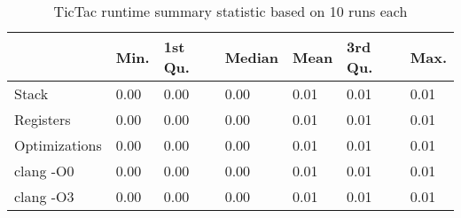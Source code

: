 \begin{table}[h!]
\centering
\begin{tabular}{p{}p{}p{}p{}p{}p{}p{}}
  \hline
 & Min. & 1st Qu. & Median & Mean & 3rd Qu. & Max. \\ 
  \hline
Stack & 0.00 & 0.00 & 0.00 & 0.01 & 0.01 & 0.01 \\ 
  Registers & 0.00 & 0.00 & 0.00 & 0.01 & 0.01 & 0.01 \\ 
  Optimizations & 0.00 & 0.00 & 0.00 & 0.01 & 0.01 & 0.01 \\ 
  clang -O0 & 0.00 & 0.00 & 0.00 & 0.01 & 0.01 & 0.01 \\ 
  clang -O3 & 0.00 & 0.00 & 0.00 & 0.01 & 0.01 & 0.01 \\ 
   \hline
\end{tabular}
\caption{TicTac runtime summary statistic based on 10 runs each}
\end{table}
